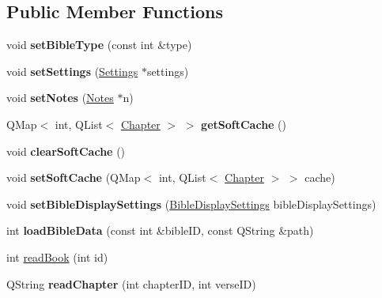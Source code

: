 \subsection*{Public Member Functions}
\begin{DoxyCompactItemize}
\item 
\hypertarget{classBible_a5d888a9ecb7988783596ba6af64b4c32}{
void {\bfseries setBibleType} (const int \&type)}
\label{classBible_a5d888a9ecb7988783596ba6af64b4c32}

\item 
\hypertarget{classBible_abbc3f50a8babc5b981463f43a526623f}{
void {\bfseries setSettings} (\hyperlink{classSettings}{Settings} $\ast$settings)}
\label{classBible_abbc3f50a8babc5b981463f43a526623f}

\item 
\hypertarget{classBible_ace91415a603f079df85a05f5ffe6d295}{
void {\bfseries setNotes} (\hyperlink{classNotes}{Notes} $\ast$n)}
\label{classBible_ace91415a603f079df85a05f5ffe6d295}

\item 
\hypertarget{classBible_a755e37d040f73db48a8cb11a76cfdd9c}{
QMap$<$ int, QList$<$ \hyperlink{structChapter}{Chapter} $>$ $>$ {\bfseries getSoftCache} ()}
\label{classBible_a755e37d040f73db48a8cb11a76cfdd9c}

\item 
\hypertarget{classBible_ae5402b0e0d92d7a34a760948eebf576f}{
void {\bfseries clearSoftCache} ()}
\label{classBible_ae5402b0e0d92d7a34a760948eebf576f}

\item 
\hypertarget{classBible_a94b020a639d4f6d36766a4f3eaa3adfa}{
void {\bfseries setSoftCache} (QMap$<$ int, QList$<$ \hyperlink{structChapter}{Chapter} $>$ $>$ cache)}
\label{classBible_a94b020a639d4f6d36766a4f3eaa3adfa}

\item 
\hypertarget{classBible_afc221da9f11ff62e49588149a08eeee6}{
void {\bfseries setBibleDisplaySettings} (\hyperlink{classBibleDisplaySettings}{BibleDisplaySettings} bibleDisplaySettings)}
\label{classBible_afc221da9f11ff62e49588149a08eeee6}

\item 
\hypertarget{classBible_a6d8d6c69442ee00dab64ef12e986d22f}{
int {\bfseries loadBibleData} (const int \&bibleID, const QString \&path)}
\label{classBible_a6d8d6c69442ee00dab64ef12e986d22f}

\item 
int \hyperlink{classBible_a0057dd2ba35fe377624da860a6959cd9}{readBook} (int id)
\item 
\hypertarget{classBible_a42e0e107fa2b5966bfa90f60a0fdc3cb}{
QString {\bfseries readChapter} (int chapterID, int verseID)}
\label{classBible_a42e0e107fa2b5966bfa90f60a0fdc3cb}


\end{DoxyCompactItemize}
